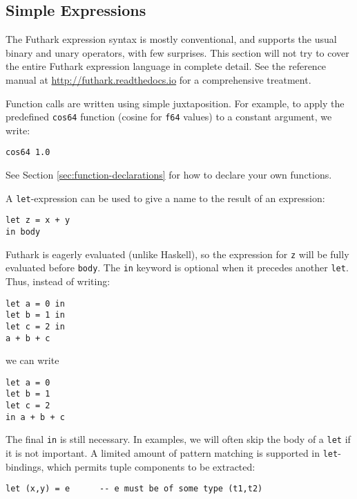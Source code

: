 \documentclass[oneside,11pt]{book}
\begin{document}
\subsection{Simple Expressions}

The Futhark expression syntax is mostly conventional, and supports the
usual binary and unary operators, with few surprises.  This section
will not try to cover the entire Futhark expression language in
complete detail.  See the reference manual at
\url{http://futhark.readthedocs.io} for a comprehensive treatment.

Function calls are written using simple juxtaposition.  For example,
to apply the predefined \texttt{cos64} function (cosine for
\texttt{f64} values) to a constant argument, we write:

\begin{lstlisting}
cos64 1.0
\end{lstlisting}

\noindent
See Section \ref{sec:function-declarations} for how to declare your
own functions.

A \texttt{let}-expression can be used to give a name to the result of
an expression:

\begin{lstlisting}
let z = x + y
in body
\end{lstlisting}

Futhark is eagerly evaluated (unlike Haskell), so the expression for
\texttt{z} will be fully evaluated before \texttt{body}.  The \texttt{in} keyword is optional when it precedes another
\texttt{let}.  Thus, instead of writing:

\begin{lstlisting}
let a = 0 in
let b = 1 in
let c = 2 in
a + b + c
\end{lstlisting}

\noindent
we can write

\begin{lstlisting}
let a = 0
let b = 1
let c = 2
in a + b + c
\end{lstlisting}

\noindent
The final \texttt{in} is still necessary.  In examples, we will often
skip the body of a \texttt{let} if it is not important.  A limited
amount of pattern matching is supported in \texttt{let}-bindings,
which permits tuple components to be extracted:

\begin{lstlisting}
let (x,y) = e      -- e must be of some type (t1,t2)
\end{lstlisting}
\end{document}
